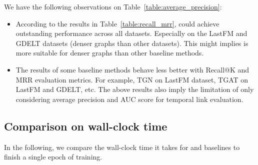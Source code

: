 We have the following observations on Table~\ref{table:average_precision}:
\begin{itemize} [noitemsep,topsep=0pt,leftmargin=2mm ]
    \item According to the results in Table~\ref{table:recall_mrr}, \our could achieve outstanding performance across all datasets. Especially on the LastFM and GDELT datasets (denser graphs than other datasets). This might implies \our is more suitable for denser graphs than other baseline methods.
    \item The results of some baseline methods behave less better with Recall@K and MRR evaluation metrics. For example, TGN on LastFM dataset, TGAT on LastFM and GDELT, etc. The above results also imply the limitation of only considering average precision and AUC score for temporal link evaluation.
\end{itemize}





\clearpage
\subsection{Comparison on wall-clock time} \label{section:wall_clock_time}

In the following, we compare the wall-clock time it takes for \our and baselines to finish a single epoch of training. 

